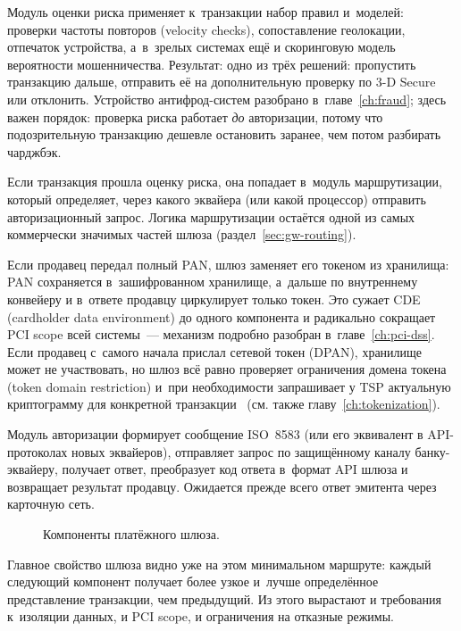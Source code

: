Модуль оценки риска применяет к~транзакции набор правил и~моделей:
проверки частоты повторов (velocity checks), сопоставление
геолокации, отпечаток устройства, а~в~зрелых системах ещё и
скоринговую модель вероятности мошенничества.
Результат: одно из трёх решений: пропустить
транзакцию дальше, отправить её на дополнительную проверку
по 3-D Secure или отклонить. Устройство антифрод-систем
разобрано в~главе~\ref{ch:fraud}; здесь важен порядок:
проверка риска работает \emph{до} авторизации, потому что
подозрительную транзакцию дешевле остановить заранее, чем потом
разбирать чарджбэк.

Если транзакция прошла оценку риска, она попадает в~модуль
маршрутизации, который определяет, через какого эквайера
(или какой процессор) отправить авторизационный запрос.
Логика маршрутизации остаётся одной из самых коммерчески
значимых частей шлюза (раздел~\ref{sec:gw-routing}).

Если продавец передал полный PAN, шлюз заменяет
его токеном из хранилища: PAN сохраняется в~зашифрованном
хранилище, а~дальше по внутреннему конвейеру и в~ответе продавцу
циркулирует только токен. Это сужает CDE (cardholder data environment)
до одного компонента и радикально сокращает PCI scope всей
системы~--- механизм подробно разобран в~главе~\ref{ch:pci-dss}.
Если продавец с~самого начала прислал
сетевой токен (DPAN), хранилище может не участвовать, но шлюз
всё равно проверяет ограничения домена токена (token domain
restriction) и~при необходимости запрашивает у TSP актуальную
криптограмму для конкретной транзакции~\cite{emvco-payment-tokenisation-guide}
(см. также главу~\ref{ch:tokenization}).

Модуль авторизации формирует сообщение ISO~8583
(или его эквивалент в API-протоколах новых эквайеров),
отправляет запрос по защищённому каналу банку-эквайеру,
получает ответ, преобразует код ответа в~формат API шлюза
и возвращает результат продавцу. Ожидается прежде всего
ответ эмитента через карточную сеть.

\begin{figure}[tbp]
  \centering
  \caption{Компоненты платёжного шлюза.}\label{fig:gateway-components}
\end{figure}

Главное свойство шлюза видно уже на этом минимальном маршруте:
каждый следующий компонент получает более узкое и~лучше
определённое представление транзакции, чем предыдущий.
Из этого вырастают и требования к~изоляции данных, и PCI scope,
и ограничения на отказные режимы.

